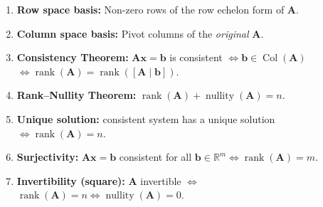 \documentclass[12pt,a4paper]{article}
\newcommand{\R}{\mathbb{R}}
\newcommand{\vv}[1]{\mathbf{#1}}
\newcommand{\rank}{\operatorname{rank}}
\newcommand{\nullity}{\operatorname{nullity}}
\newcommand{\Col}{\operatorname{Col}}
\newcommand{\mat}[1]{\mathbf{#1}}
\begin{document}
	\begin{tcolorbox}[
		enhanced, breakable,
		colback=gray!8!white,
		colframe=gray!60!black,
		fonttitle=\bfseries,
		title={Key Results at a Glance},
		attach boxed title to top left={yshift=-2mm, xshift=6mm},
		boxed title style={colback=gray!60!black}
		]
		\begin{enumerate}[label=\textbf{\arabic*.}, itemsep=6pt]
			\item \textbf{Row space basis:} Non-zero rows of the row echelon form of \(\mat{A}\).
			
			\item \textbf{Column space basis:} Pivot columns of the \emph{original} \(\mat{A}\).
			
			\item \textbf{Consistency Theorem:}
			\(\mat{A}\vv{x}=\vv{b}\) is consistent \(\iff \vv{b}\in\Col(\mat{A})\)
			\(\iff \rank(\mat{A})=\rank([\mat{A}\mid\vv{b}])\).
			
			\item \textbf{Rank--Nullity Theorem:}
			\(\rank(\mat{A}) + \nullity(\mat{A}) = n\).
			
			\item \textbf{Unique solution:} consistent system has a unique solution
			\(\iff \rank(\mat{A})=n\).
			
			\item \textbf{Surjectivity:} \(\mat{A}\vv{x}=\vv{b}\) consistent for all
			\(\vv{b}\in\R^m \iff \rank(\mat{A})=m\).
			
			\item \textbf{Invertibility (square):} \(\mat{A}\) invertible \(\iff\)
			\(\rank(\mat{A})=n \iff \nullity(\mat{A})=0\).
		\end{enumerate}
	\end{tcolorbox}
	
\end{document}
